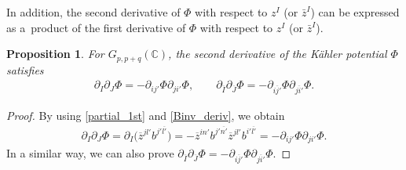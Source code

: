 \documentclass[10pt,a4paper]{amsart}
\numberwithin{equation}{section}
\newtheorem{Proposition}[Theorem]{Proposition}
 { \theoremstyle{definition}
\newtheorem{Definition}[Theorem]{Definition}
\newtheorem{Note}[Theorem]{Note}
\newtheorem{Example}[Theorem]{Example}
\newtheorem{Remark}[Theorem]{Remark} }
\begin{document}
In addition, the second derivative of $\Phi$ with respect to $z^{I}$ (or $\bar{z}^{I}$) can be expressed as a~product of the first derivative of $\Phi$ with respect to $z^{I}$ (or $\bar{z}^{I}$).
\begin{Proposition}\label{potential_deriv_grassmann_2nd}
For $ G_{p,p+q}(\mathbb{C})$, the second derivative of the K\"ahler potential $\Phi$ satisfies
\begin{align*}
 \partial_{I}
 \partial_{J}
 \Phi = -
 \partial_{ij'}
 \Phi
 \partial_{ji'}
 \Phi,
 \qquad
 \partial_{\overline{I}}
 \partial_{\overline{J}}
 \Phi = -
 \partial_{\overline{ij'}}
 \Phi
 \partial_{\overline{ji'}} \Phi.
\end{align*}
\end{Proposition}

\begin{proof}
By using \eqref{partial_1st} and \eqref{Binv_deriv}, we obtain
\begin{align*}
 \partial_{I}
 \partial_{J}
 \Phi
 =
 \partial_{I}
 \bigl(
 \overline{z}^{jl'}
 b^{j'\overline{l'}}
 \bigr)
 =
 -
 \overline{z}^{in'}
 b^{j'\overline{n'}}
 \overline{z}^{jl'}
 b^{i'\overline{l'}}
 =
 -
 \partial_{ij'}
 \Phi
 \partial_{ji'}
 \Phi.
\end{align*}
In a similar way, we can also prove
$ \partial_{\overline{I}} \partial_{\overline{J}} \Phi = - \partial_{\overline{ij'}} \Phi \partial_{\overline{ji'}} \Phi$.
\end{proof}
\end{document}
